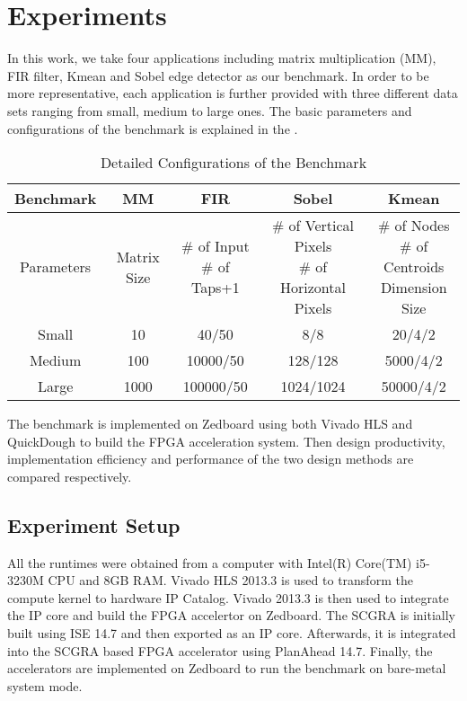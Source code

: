 \section{Experiments}\label{sec:experiments}
In this work, we take four applications including matrix multiplication (MM), FIR filter, Kmean and Sobel edge detector as our benchmark. In order to be more representative, each application is further provided with three different data sets ranging from small, medium to large ones. The basic parameters and configurations of the benchmark is explained in the .

\begin{table*}[t]
  \caption{Detailed Configurations of the Benchmark}
  \label{tab:benchmark-config}
  \centering
  \begin{tabular}{c|c|c|c|c}
  \hline
  Benchmark & MM & FIR & Sobel & Kmean \\ \hline
  Parameters & Matrix Size & \tabincell{c}{\# of Input \\ \# of Taps+1} & \tabincell{c}{ \# of Vertical Pixels \\ \# of Horizontal Pixels} & \tabincell{c}{\# of Nodes \\ \# of Centroids \\ Dimension Size} \\ \hline
  Small & 10 & 40/50 & 8/8 & 20/4/2 \\ \hline
  Medium & 100 & 10000/50 & 128/128 & 5000/4/2  \\ \hline
  Large & 1000 & 100000/50 & 1024/1024 & 50000/4/2 \\ \hline
  \end{tabular}
\end{table*}


The benchmark is implemented on Zedboard using both Vivado HLS and QuickDough to build the FPGA acceleration system. Then design productivity, implementation efficiency and performance of the two design methods are compared respectively.

\subsection{Experiment Setup}
All the runtimes were obtained from a computer with Intel(R) Core(TM) i5-3230M CPU and 8GB RAM. Vivado HLS 2013.3 is used to transform the compute kernel to hardware IP Catalog. Vivado 2013.3 is then used to integrate the IP core and build the FPGA accelertor on Zedboard. The SCGRA is initially built using ISE 14.7 and then exported as an IP core. Afterwards, it is integrated into the SCGRA based FPGA accelerator using PlanAhead 14.7. Finally, the accelerators are implemented on Zedboard to run the benchmark on bare-metal system mode.

